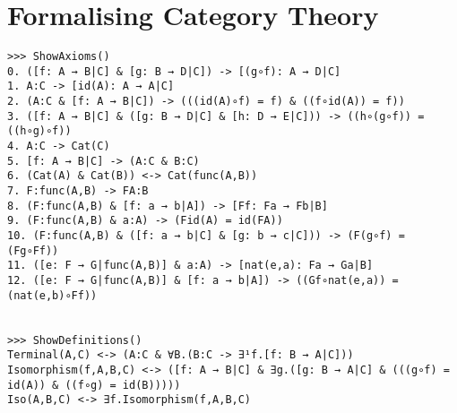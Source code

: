 \documentclass[a4paper,12pt,leqno]{article}
\numberwithin{equation}{section}
\begin{document}
\section*{Formalising Category Theory}

\begin{verbatim}
>>> ShowAxioms()
0. ([f: A → B|C] & [g: B → D|C]) -> [(g∘f): A → D|C] 
1. A:C -> [id(A): A → A|C] 
2. (A:C & [f: A → B|C]) -> (((id(A)∘f) = f) & ((f∘id(A)) = f)) 
3. ([f: A → B|C] & ([g: B → D|C] & [h: D → E|C])) -> ((h∘(g∘f)) = ((h∘g)∘f)) 
4. A:C -> Cat(C) 
5. [f: A → B|C] -> (A:C & B:C) 
6. (Cat(A) & Cat(B)) <-> Cat(func(A,B)) 
7. F:func(A,B) -> FA:B 
8. (F:func(A,B) & [f: a → b|A]) -> [Ff: Fa → Fb|B] 
9. (F:func(A,B) & a:A) -> (Fid(A) = id(FA)) 
10. (F:func(A,B) & ([f: a → b|C] & [g: b → c|C])) -> (F(g∘f) = (Fg∘Ff)) 
11. ([e: F → G|func(A,B)] & a:A) -> [nat(e,a): Fa → Ga|B] 
12. ([e: F → G|func(A,B)] & [f: a → b|A]) -> ((Gf∘nat(e,a)) = (nat(e,b)∘Ff)) 


>>> ShowDefinitions()
Terminal(A,C) <-> (A:C & ∀B.(B:C -> ∃¹f.[f: B → A|C]))
Isomorphism(f,A,B,C) <-> ([f: A → B|C] & ∃g.([g: B → A|C] & (((g∘f) = id(A)) & ((f∘g) = id(B)))))
Iso(A,B,C) <-> ∃f.Isomorphism(f,A,B,C)


\end{verbatim}
\end{document}
